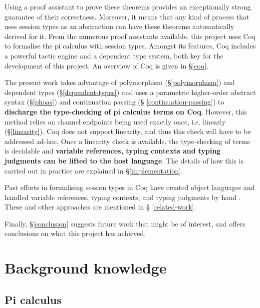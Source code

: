 \documentclass{mproj}
\begin{document}
Using a proof assistant to prove these theorems provides an exceptionally strong
guarantee of their correctness. Moreover, it means that any kind of process that
uses session types as an abstraction can have these theorems automatically
derived for it. From the numerous proof assistants available, this project uses
Coq to formalise the pi calculus with session types. Amongst its features, Coq
includes a powerful tactic engine and a dependent type system, both key for the
development of this project. An overview of Coq is given in \S \ref{coq}.

The present work takes advantage of polymorphism (\S \ref{polymorphism}) and
dependent types (\S \ref{dependent-types}) and uses a parametric higher-order
abstract syntax (\S \ref{phoas}) and continuation passing (\S
\ref{continuation-passing}) to \textbf{discharge the type-checking of pi
calculus terms on Coq}. However, this method relies on channel endpoints being
used exactly once, i.e. linearly (\S \ref{linearity}). Coq does not support
linearity, and thus this check will have to be addressed ad-hoc. Once a
linearity check is available, the type-checking of terms is decidable and
\textbf{variable references, typing contexts and typing judgments can be lifted
to the host language}. The details of how this is carried out in practice are
explained in \S \ref{implementation}.

Past efforts in formalising session types in Coq have created object languages
and handled variable references, typing contexts, and typing judgments by hand
\cite{Dilmore2019}. These and other approaches are mentioned in \S
\ref{related-work}.

Finally, \S \ref{conclusion} suggests future work that might be of interest, and
offers conclusions on what this project has achieved.

\chapter{Background knowledge}

\section{Pi calculus}\label{pi-calculus}
\end{document}
